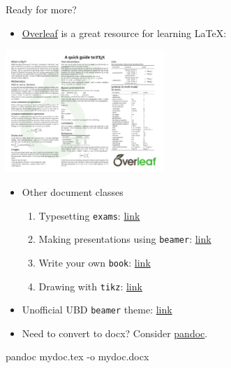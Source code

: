 \documentclass[,aspectratio=43]{beamer}
\newenvironment{Shaded}{\begin{snugshade}}{\end{snugshade}}
\newcommand{\AttributeTok}[1]{\textcolor[rgb]{0.49,0.56,0.16}{#1}}
\newcommand{\ExtensionTok}[1]{#1}
\newcommand{\NormalTok}[1]{#1}
\providecommand{\tightlist}{%
  \setlength{\itemsep}{0pt}\setlength{\parskip}{0pt}}
\begin{document}
\begin{frame}[fragile]{Ready for more?}
\protect\hypertarget{ready-for-more}{}
\begin{itemize}
\tightlist
\item
  \href{https://www.overleaf.com/for/community/resources}{\underline{Overleaf}}
  is a great resource for learning \LaTeX:
\end{itemize}

\begin{center}
\href{https://assets.ctfassets.net/nrgyaltdicpt/4e825etqMUW8vTF8drfRbw/d4f3d9adcb2980b80818f788e36316b2/A_quick_guide_to_LaTeX__Overleaf_version.pdf}{\includegraphics[width=0.45\textwidth,height=\textheight]{figure/quick_guide_latex.pdf}}

\end{center}

\begin{itemize}
\item
  Other document classes

  \begin{enumerate}
  \tightlist
  \item
    Typesetting \texttt{exams}:
    \href{https://www.overleaf.com/learn/latex/Typesetting_exams_in_LaTeX}{link}
  \item
    Making presentations using \texttt{beamer}:
    \href{https://www.overleaf.com/learn/latex/Beamer_Presentations\%3A_A_Tutorial_for_Beginners_(Part_1)—Getting_Started}{link}
  \item
    Write your own \texttt{book}:
    \href{https://www.overleaf.com/gallery/tagged/book}{link}
  \item
    Drawing with \texttt{tikz}: \href{http://texample.net/tikz/}{link}
  \end{enumerate}
\item
  Unofficial UBD \texttt{beamer} theme:
  \href{https://github.com/haziqj/ubd-beamer}{link}
\item
  Need to convert to docx? Consider \href{https://pandoc.org}{pandoc}.
\end{itemize}

\begin{Shaded}
\begin{Highlighting}[]
\ExtensionTok{pandoc}\NormalTok{ mydoc.tex }\AttributeTok{{-}o}\NormalTok{ mydoc.docx}
\end{Highlighting}
\end{Shaded}
\end{frame}
\end{document}
